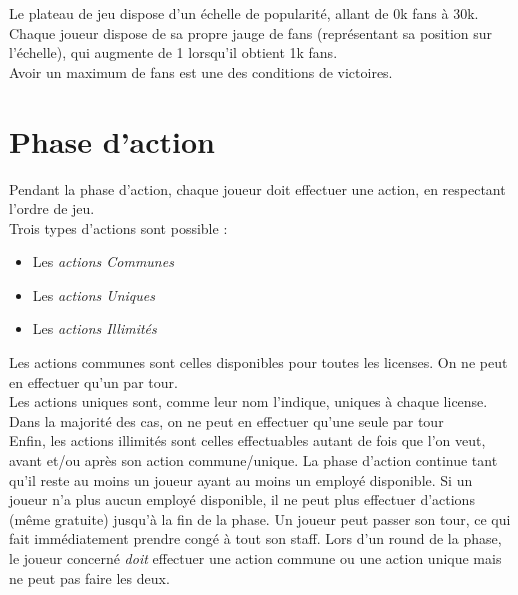             Le plateau de jeu dispose d'un échelle de popularité, allant de 0k fans à 30k.
            Chaque joueur dispose de sa propre jauge de fans (représentant sa position sur l'échelle),
            qui augmente de 1 lorsqu'il obtient 1k fans.
            \\
            Avoir un maximum de fans est une des conditions de victoires.



        \section{Phase d'action}

            Pendant la phase d'action, chaque joueur doit effectuer une action, en respectant l'ordre de jeu.
            \\
            Trois types d'actions sont possible :
            \begin{itemize}
                \item Les \textit{actions Communes}
                \item Les \textit{actions Uniques}
                \item Les \textit{actions Illimités}
            \end{itemize}

            Les actions communes sont celles disponibles pour toutes les licenses.
            On ne peut en effectuer qu'un par tour.
            \\
            Les actions uniques sont, comme leur nom l'indique, uniques à chaque license.
            Dans la majorité des cas, on ne peut en effectuer qu'une seule par tour
            \\
            Enfin, les actions illimités sont celles effectuables autant de fois que
            l'on veut, avant et/ou après son action commune/unique.
            \newline
            La phase d'action continue tant qu'il reste au moins un joueur ayant au moins un employé disponible.
            Si un joueur n'a plus aucun employé disponible, il ne peut plus effectuer d'actions (même gratuite)
            jusqu'à la fin de la phase.
            Un joueur peut passer son tour, ce qui fait immédiatement prendre congé à tout son staff.
            \newline
            Lors d'un round de la phase, le joueur concerné \emph{doit} effectuer une action commune
            ou une action unique mais ne peut pas faire les deux.

